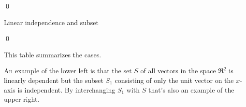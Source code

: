 \documentclass[10pt,t,serif,professionalfont]{beamer}
\begin{document}
\begin{frame}

\pause
\pf
{}
\qed
\end{frame}




\begin{frame}{Linear independence and subset}
\lm[le:SubsetPreserveLI]

\pf
{}
\qed

\pause
\medskip
This table summarizes the cases.
\medskip

An example of the lower left is that the set $S$ of all vectors in the
space $\Re^2$ is linearly dependent but the subset $S_1$ consisting of only the 
unit vector on the $x$-axis is independent.
By interchanging $S_1$ with $S$ that's also an example of the upper right.
\end{frame}



% 
\end{document}
